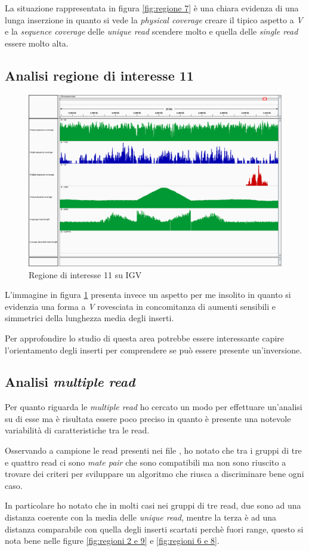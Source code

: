 La situazione rappresentata in figura \ref{fig:regione 7} è una chiara evidenza di una lunga inserzione in quanto si vede la \emph{physical coverage} creare il tipico aspetto a \emph{V} e la \emph{sequence coverage} delle \emph{unique read} scendere molto e quella delle \emph{single read} essere molto alta.

\subsection{Analisi regione di interesse 11}
\begin{figure}[htbp]
	\centering
	\includegraphics[width=.45\textwidth]{immagini/igv_regione11.png}
	\caption{Regione di interesse 11 su IGV}
	\label{fig:regioni 11}
\end{figure}

L'immagine in figura \ref{fig:regioni 11} presenta invece un aspetto per me insolito in quanto si evidenzia una forma a \emph{V} rovesciata in concomitanza di aumenti sensibili e simmetrici della lunghezza media degli inserti.

Per approfondire lo studio di questa area potrebbe essere interessante capire l'orientamento degli inserti per comprendere se può essere presente un'inversione.

\subsection{Analisi \emph{multiple read}}
Per quanto riguarda le \emph{multiple read} ho cercato un modo per effettuare un'analisi su di esse ma è risultata essere poco preciso in quanto è presente una notevole variabilità di caratteristiche tra le read.

Osservando a campione le read presenti nei file , ho notato che tra i gruppi di tre e quattro read ci sono \emph{mate pair} che sono compatibili ma non sono riuscito a trovare dei criteri per sviluppare un algoritmo che riusca a discriminare bene ogni caso.

In particolare ho notato che in molti casi nei gruppi di tre read, due sono ad una distanza coerente con la media delle \emph{unique read}, mentre la terza è ad una distanza comparabile con quella degli inserti scartati perchè fuori range, questo si nota bene nelle figure \ref{fig:regioni 2 e 9} e \ref{fig:regioni 6 e 8}.

